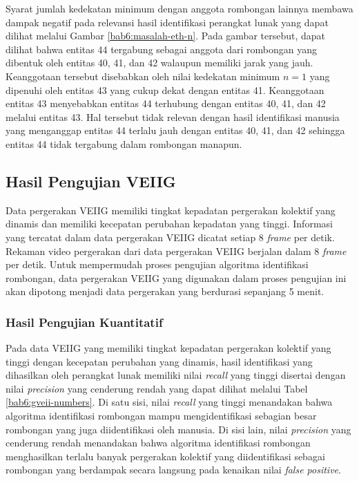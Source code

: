 Syarat jumlah kedekatan minimum dengan anggota rombongan lainnya membawa dampak negatif pada relevansi hasil identifikasi perangkat lunak yang dapat dilihat melalui Gambar \ref{bab6:masalah-eth-n}. Pada gambar tersebut, dapat dilihat bahwa entitas 44 tergabung sebagai anggota dari rombongan yang dibentuk oleh entitas 40, 41, dan 42 walaupun memiliki jarak yang jauh. Keanggotaan tersebut disebabkan oleh nilai kedekatan minimum $n = 1$ yang dipenuhi oleh entitas 43 yang cukup dekat dengan entitas 41. Keanggotaan entitas 43 menyebabkan entitas 44 terhubung dengan entitas 40, 41, dan 42 melalui entitas 43. Hal tersebut tidak relevan dengan hasil identifikasi manusia yang menganggap entitas 44 terlalu jauh dengan entitas 40, 41, dan 42 sehingga entitas 44 tidak tergabung dalam rombongan manapun.

\subsection{Hasil Pengujian VEIIG}
\label{subsec:veiig-result}

Data pergerakan VEIIG memiliki tingkat kepadatan pergerakan kolektif yang dinamis dan memiliki kecepatan perubahan kepadatan yang tinggi. Informasi yang tercatat dalam data pergerakan VEIIG dicatat setiap 8 \textit{frame} per detik. Rekaman video pergerakan dari data pergerakan VEIIG berjalan dalam 8 \textit{frame} per detik. Untuk mempermudah proses pengujian algoritma identifikasi rombongan, data pergerakan VEIIG yang digunakan dalam proses pengujian ini akan dipotong menjadi data pergerakan yang berdurasi sepanjang 5 menit.

\subsubsection{Hasil Pengujian Kuantitatif}
\label{subsubsec:veiig-quantitative}

Pada data VEIIG yang memiliki tingkat kepadatan pergerakan kolektif yang tinggi dengan kecepatan perubahan yang dinamis, hasil identifikasi yang dihasilkan oleh perangkat lunak memiliki nilai \textit{recall} yang tinggi disertai dengan nilai \textit{precision} yang cenderung rendah yang dapat dilihat melalui Tabel \ref{bab6:gveii-numbers}. Di satu sisi, nilai \textit{recall} yang tinggi menandakan bahwa algoritma identifikasi rombongan mampu mengidentifikasi sebagian besar rombongan yang juga diidentifikasi oleh manusia. Di sisi lain, nilai \textit{precision} yang cenderung rendah menandakan bahwa algoritma identifikasi rombongan menghasilkan terlalu banyak pergerakan kolektif yang diidentifikasi sebagai rombongan yang berdampak secara langsung pada kenaikan nilai \textit{false positive}.

